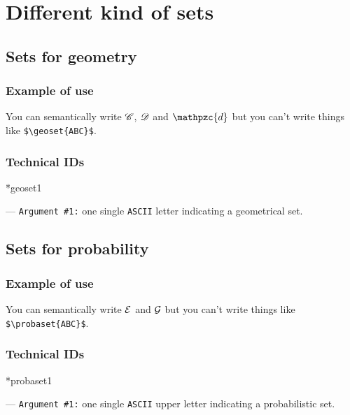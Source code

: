 \documentclass[12pt,a4paper]{article}
\makeatletter
\newcommand\IDmacro{\@ifstar{\@IDmacroStar}{\@IDmacroNoStar}}
\newcommand\@IDmacroNoStar[3]{%
        \texttt{%
        	\textbackslash#1%
        	\IfStrEq{#2}{0}{}{%
        		\,\,[#2 Option%
				\IfStrEq{#2}{1}{}{s}]%
			}%
    	    \,\,(#3 Argument%
				\IfStrEq{#3}{1}{}{s})%
	   	}
        \immediate\write\tempfile{macro@#1@#2@#3}%
    }
\newcommand\@IDmacroStar[2]{%
        \@IDmacroNoStar{#1}{0}{#2}%
    }
\newcommand\@IDoptarg[2]{%
    	\vspace{0.5em}
		--- \texttt{#1 \##2:}%
	}
\newcommand\IDarg[1]{%
    	\@IDoptarg{Argument}{#1}%
	}
\newcommand\ascii{\texttt{ASCII}}
\newcommand\probaset[1]{
	\IfSubStr{,A,B,C,D,E,F,G,H,I,J,K,L,M,N,O,P,Q,R,S,T,U,V,W,X,Y,Z,}{,#1,}{
		\mathcal{#1}
	}{%
		\PackageError{lymath}{Command << probaset >> only accepts single upper case letters}%
	}
}
\newcommand\geoset[1]{
	\IfSubStr{,A,B,C,D,E,F,G,H,I,J,K,L,M,N,O,P,Q,R,S,T,U,V,W,X,Y,Z,}{,#1,}{
		\mathscr{#1}
	}{%
		\IfSubStr{,a,b,c,d,e,f,g,h,i,j,k,l,m,n,o,p,q,r,s,t,u,v,w,x,y,z,}{,#1,}{
			\mathpzc{#1}
		}{%
			\PackageError{lymath}{Command << fieldset >> only accepts single h, k or upper case letter}%
		}
	}
}
\makeatother
\begin{document}
\section{Different kind of sets}

    \subsection{Sets for geometry}

		\subsubsection{Example of use}

\begin{tcblisting}{}
You can semantically write $\geoset{C}$, $\geoset{D}$ and $\geoset{d}$
but you can't write things like \verb+$\geoset{ABC}$+.
\end{tcblisting}


		\subsubsection{Technical IDs}

\IDmacro*{geoset}{1}

\IDarg{1} one single \ascii{} letter indicating a geometrical set.



    \subsection{Sets for probability}

		\subsubsection{Example of use}

\begin{tcblisting}{}
You can semantically write $\probaset{E}$ and $\probaset{G}$
but you can't write things like \verb+$\probaset{ABC}$+.
\end{tcblisting}


		\subsubsection{Technical IDs}

\IDmacro*{probaset}{1}

\IDarg{1} one single \ascii{} upper letter indicating a probabilistic set.
\end{document}

